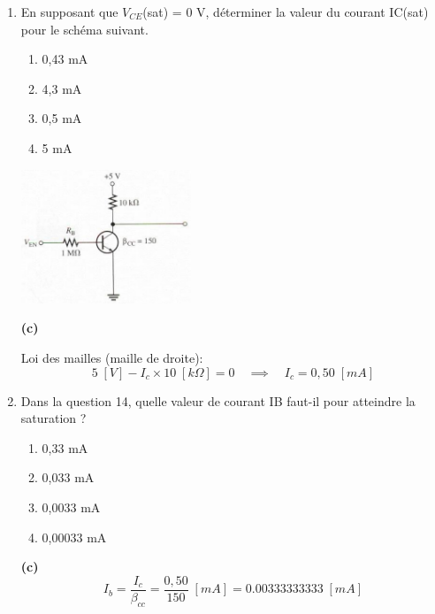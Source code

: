 \documentclass[a4paper]{article}
\begin{document}
\begin{enumerate}
\item En supposant que $V_{CE}$(sat) = 0 V, déterminer la valeur du courant IC(sat) pour le schéma suivant.
\begin{enumerate}
    \item 0,43 mA
    \item 4,3 mA
    \item 0,5 mA
    \item 5 mA
\end{enumerate}
\begin{center}
    \includegraphics[width=0.4\textwidth]{images/interro1-ex14-1.PNG}
\end{center}
\begin{example}
    \textbf{(c)}

    Loi des mailles (maille de droite):
    \[
        5 \; [V] - I_c \times 10 \; [k\Omega] = 0
        \quad \implies \quad
        I_c = 0,50 \; [mA]
    \]
\end{example}





\item Dans la question 14, quelle valeur de courant IB faut-il pour atteindre la saturation ?
\begin{enumerate}
    \item 0,33 mA
    \item 0,033 mA
    \item 0,0033 mA
    \item 0,00033 mA
\end{enumerate}
\begin{example}
    \textbf{(c)}
    \[ I_b = \frac{I_c}{\beta_{cc}} = \frac{0,50}{150} \; [mA] = 0.00333333333 \; [mA] \]
\end{example}





\end{enumerate}
\end{document}
